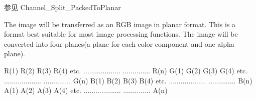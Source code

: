\begin{Desc}
\begin{description}
\begin{DoxySeeAlso}{参见}
Channel\+\_\+\+Split\+\_\+\+Packed\+To\+Planar 
\end{DoxySeeAlso}
\item[{\em 
\hypertarget{group___common_interface_gga02e0fc32ff10e0bc0f2e8b9c321d65c9ae94b9d8b48cd2d3d66244c631dea8f14}{idpf\+R\+G\+Bx888\+Planar}\label{group___common_interface_gga02e0fc32ff10e0bc0f2e8b9c321d65c9ae94b9d8b48cd2d3d66244c631dea8f14}
}]The image will be transferred as an R\+G\+B image in planar format. This is a format best suitable for most image processing functions. The image will be converted into four planes(a plane for each color component and one alpha plane).


\begin{DoxyCode}
R(1) R(2) R(3) R(4) etc.
...................
.............. R(n)
G(1) G(2) G(3) G(4) etc.
...................
.............. G(n)
B(1) B(2) B(3) B(4) etc.
...................
.............. B(n)
A(1) A(2) A(3) A(4) etc.
...................
.............. A(n)
\end{DoxyCode}



\end{description}
\end{Desc}
